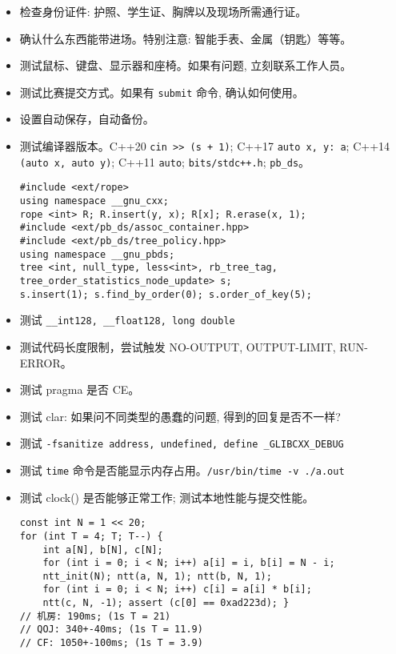 \begin{small}
\begin{itemize}[leftmargin=1mm]
    \setlength{\itemsep}{0pt}
    \setlength{\parskip}{0.5pt}
    \item 检查身份证件: 护照、学生证、胸牌以及现场所需通行证。
    \item 确认什么东西能带进场。特别注意: 智能手表、金属（钥匙）等等。
    \item 测试鼠标、键盘、显示器和座椅。如果有问题, 立刻联系工作人员。
    \item 测试比赛提交方式。如果有 \texttt{submit} 命令, 确认如何使用。
    \item 设置自动保存，自动备份。
    \item 测试编译器版本。C++20 \texttt{cin >> (s + 1)}; C++17 \texttt{auto \lbrack x, y\rbrack : a}; C++14 \texttt{\lbrack \rbrack (auto x, auto y)}; C++11 \texttt{auto}; \texttt{bits/stdc++.h}; \texttt{pb\_ds}。
\begin{verbatim}
#include <ext/rope>
using namespace __gnu_cxx;
rope <int> R; R.insert(y, x); R[x]; R.erase(x, 1);
#include <ext/pb_ds/assoc_container.hpp> 
#include <ext/pb_ds/tree_policy.hpp> 
using namespace __gnu_pbds;
tree <int, null_type, less<int>, rb_tree_tag,
tree_order_statistics_node_update> s;
s.insert(1); s.find_by_order(0); s.order_of_key(5);
\end{verbatim}
    \item 测试 \texttt{\_\_int128, \_\_float128, long double}
    \item 测试代码长度限制，尝试触发 NO-OUTPUT, OUTPUT-LIMIT, RUN-ERROR。
    \item 测试 pragma 是否 CE。
    \item 测试 clar: 如果问不同类型的愚蠢的问题, 得到的回复是否不一样? 
    \item 测试 \texttt{-fsanitize address, undefined, define \_GLIBCXX\_DEBUG}
    \item 测试 \texttt{time} 命令是否能显示内存占用。\texttt{/usr/bin/time -v ./a.out}
    \item 测试 clock() 是否能够正常工作; 测试本地性能与提交性能。
\begin{verbatim}
const int N = 1 << 20;
for (int T = 4; T; T--) {
    int a[N], b[N], c[N];
    for (int i = 0; i < N; i++) a[i] = i, b[i] = N - i;
    ntt_init(N); ntt(a, N, 1); ntt(b, N, 1);
    for (int i = 0; i < N; i++) c[i] = a[i] * b[i];
    ntt(c, N, -1); assert (c[0] == 0xad223d); }
// 机房: 190ms; (1s T = 21)
// QOJ: 340+-40ms; (1s T = 11.9)
// CF: 1050+-100ms; (1s T = 3.9)

\end{verbatim}
\end{itemize}
\end{small}
